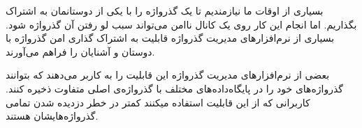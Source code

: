 
بسیاری از اوقات ما نیازمندیم تا یک گذرواژه را با یکی از دوستانمان به اشتراک بگذاریم. اما انجام این کار روی یک کانال ناامن می‌تواند سبب لو رفتن آن گذرواژه شود. بسیاری از نرم‌افزارهای مدیریت گذرواژه قابلیت به اشتراک گذاری امن گذرواژه با دوستان و آشنایان را فراهم می‌آورند.


بعضی از نرم‌افزارهای مدیریت گذرواژه این قابلیت را به کاربر می‌دهند که بتوانند گذرواژه‌های خود را در پایگاه‌داده‌های مختلف با گذرواژه‌ی اصلی متفاوت ذخیره کنند. کاربرانی که از این قابلیت استفاده میکنند کمتر در خطر دزدیده شدن تمامی گذرواژه‌هایشان هستند.
